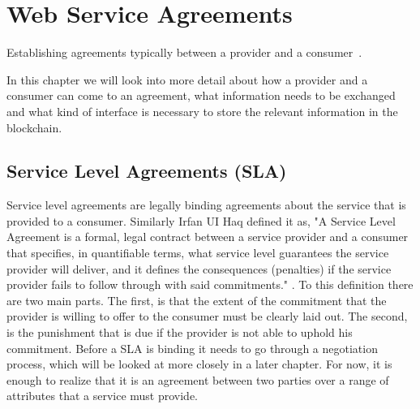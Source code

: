 \chapter{Web Service Agreements}

\begin{center}
  \begin{minipage}{0.5\textwidth}
    \begin{small}
      Establishing agreements typically between a provider and a consumer~\cite{andrieux2007web}.
    \end{small}
  \end{minipage}
  \vspace{0.5cm}
\end{center}

In this chapter we will look into more detail about how a provider and a consumer can come to an agreement, what information needs to be exchanged and what kind of interface is necessary to store the relevant information in the blockchain.

\section{Service Level Agreements (SLA)}
Service level agreements are legally binding agreements about the service that is provided to a consumer. Similarly Irfan UI Haq defined it as, "A Service Level Agreement is a formal, legal contract between a service provider and a consumer that specifies, in quantifiable terms, what service level guarantees the service provider will deliver, and it defines the consequences (penalties) if the service provider fails to follow through with said commitments." \cite{TODO PHD THESISIRFAN}. To this definition there are two main parts. The first, is that the extent of the commitment that the provider is willing to offer to the consumer must be clearly laid out. The second, is the punishment that is due if the provider is not able to uphold his commitment. Before a SLA is binding it needs to go through a negotiation process, which will be looked at more closely in a later chapter. For now, it is enough to realize that it is an agreement between two parties over a range of attributes that a service must provide.

